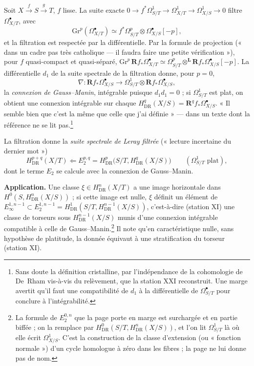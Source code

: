 \documentclass[11pt,a4paper]{article}
\begin{document}
Soit $X \xrightarrow{f} S \xrightarrow{g} T$, $f$ lisse. La suite exacte
$0 \to f^*\Omega^1_{S/T} \to \Omega^1_{X/T} \to \Omega^1_{X/S} \to 0$ filtre
$\Omega^\bullet_{X/T}$, avec
\[
  \mathrm{Gr}^p(\Omega^\bullet_{X/T}) \simeq f^*\Omega^p_{S/T} \otimes
  \Omega^\bullet_{X/S}[-p] ,
\]
et la filtration est respectée par la différentielle. Par la formule de
projection (« dans un cadre pas très catholique — il faudra faire une petite
vérification »), pour $f$ quasi-compact et quasi-séparé,
$\mathrm{Gr}^p\,\mathbf{R}f_*\Omega^\bullet_{X/T} \simeq \Omega^p_{S/T}
\otimes^{\mathbf{L}} \mathbf{R}f_*\Omega^\bullet_{X/S}[-p]$. La différentielle
$d_1$ de la suite spectrale de la filtration donne, pour $p = 0$,
\[
  \nabla : \mathbf{R}f_*\Omega^\bullet_{X/S} \longrightarrow \Omega^1_{S/T}
  \otimes \mathbf{R}f_*\Omega^\bullet_{X/S} ,
\]
la \emph{connexion de Gauss--Manin}, intégrable puisque $d_1 d_1 = 0$ ; si
$\Omega^1_{S/T}$ est plat, on obtient une connexion intégrable sur chaque
$H^q_{\mathrm{DR}}(X/S) = \mathbf{R}^q f_*\Omega^\bullet_{X/S}$. « Il semble bien
que c'est la même que celle que j'ai définie » — dans un texte dont la
référence ne se lit pas.\footnote{Sans doute la définition cristalline,
par l'indépendance de la cohomologie de De~Rham vis-à-vis du relèvement,
que la station XXI reconstruit. Une marge avertit qu'il faut une
compatibilité de $d_1$ à la différentielle de $\Omega^\bullet_{S/T}$ pour
conclure à l'intégrabilité.}

La filtration donne la \emph{suite spectrale de Leray filtrée} (« lecture
incertaine du dernier mot »)
\[
  H^{p+q}_{\mathrm{DR}}(X/T) \Longleftarrow E_2^{p,q} =
  H^p_{\mathrm{DR}}\bigl(S/T, H^q_{\mathrm{DR}}(X/S)\bigr)
  \qquad (\Omega^1_{S/T} \text{ plat}),
\]
dont le terme $E_2$ se calcule avec la connexion de Gauss--Manin.

\textbf{Application.} Une classe $\xi \in H^n_{\mathrm{DR}}(X/T)$ a une image
horizontale dans $H^0(S, H^n_{\mathrm{DR}}(X/S))$ ; si cette image est nulle,
$\xi$ définit un élément de $E_\infty^{1,n-1} \subset E_2^{1,n-1} =
H^1_{\mathrm{DR}}(S/T, H^{n-1}_{\mathrm{DR}}(X/S))$, c'est-à-dire (station XI) une
classe de torseurs sous $H^{n-1}_{\mathrm{DR}}(X/S)$ munis d'une connexion
intégrable compatible à celle de Gauss--Manin.\footnote{La formule de
$E_2^{0,n}$ que la page porte en marge est surchargée et en partie biffée ;
on la remplace par $H^0_{\mathrm{DR}}(S/T, H^n_{\mathrm{DR}}(X/S))$, et l'on lit
$\Omega^1_{S/T}$ là où elle écrit $\Omega^1_{X/S}$. C'est la construction de
la classe d'extension (ou « fonction normale ») d'un cycle homologue à zéro
dans les fibres ; la page ne lui donne pas de nom.} Il note qu'en
caractéristique nulle, sans hypothèse de platitude, la donnée équivaut à une
stratification du torseur (station XI).
\end{document}
